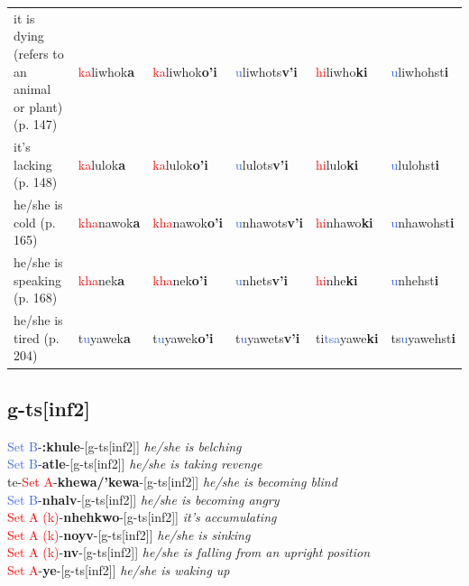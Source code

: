 \documentclass[oneside,openany]{book}%
\begin{document}
\begin{tabularx}{\textwidth}{>{\hsize=1.5\hsize\RaggedRight}X >{\hsize=0.9\hsize}X >{\hsize=0.9\hsize}X >{\hsize=0.9\hsize}X >{\hsize=0.9\hsize}X >{\hsize=0.9\hsize}X}
it is dying (refers to an animal or plant) (p. 147)&\textcolor{Red}{ka}liwhok\textbf{a}&\textcolor{Red}{ka}liwhok\textbf{o'i}&\textcolor{RoyalBlue}{u}liwhots\textbf{v'i}&\textcolor{Red}{hi}liwho\textbf{ki}&\textcolor{RoyalBlue}{u}liwhohst\textbf{i}\\%
it's lacking (p. 148)&\textcolor{Red}{ka}lulok\textbf{a}&\textcolor{Red}{ka}lulok\textbf{o'i}&\textcolor{RoyalBlue}{u}lulots\textbf{v'i}&\textcolor{Red}{hi}lulo\textbf{ki}&\textcolor{RoyalBlue}{u}lulohst\textbf{i}\\%
he/she is cold (p. 165)&\textcolor{Red}{kha}nawok\textbf{a}&\textcolor{Red}{kha}nawok\textbf{o'i}&\textcolor{RoyalBlue}{u}nhawots\textbf{v'i}&\textcolor{Red}{hi}nhawo\textbf{ki}&\textcolor{RoyalBlue}{u}nhawohst\textbf{i}\\%
he/she is speaking (p. 168)&\textcolor{Red}{kha}nek\textbf{a}&\textcolor{Red}{kha}nek\textbf{o'i}&\textcolor{RoyalBlue}{u}nhets\textbf{v'i}&\textcolor{Red}{hi}nhe\textbf{ki}&\textcolor{RoyalBlue}{u}nhehst\textbf{i}\\%
he/she is tired (p. 204)&t\textcolor{RoyalBlue}{u}yawek\textbf{a}&t\textcolor{RoyalBlue}{u}yawek\textbf{o'i}&t\textcolor{RoyalBlue}{u}yawets\textbf{v'i}&ti\textcolor{RoyalBlue}{tsa}yawe\textbf{ki}&ts\textcolor{RoyalBlue}{u}yawehst\textbf{i}\\%
\bottomrule%
\end{tabularx}%
\vspace{1em}%
\needspace{1in}%
\subsection*{g-ts[inf2]}%
\textcolor{RoyalBlue}{Set B}{-}\textbf{:khule}{-}[g-ts[inf2]] \textit{ he/she is belching} \\%
\textcolor{RoyalBlue}{Set B}{-}\textbf{atle}{-}[g-ts[inf2]] \textit{ he/she is taking revenge} \\%
te{-}\textcolor{Red}{Set A}{-}\textbf{khewa/'kewa}{-}[g-ts[inf2]] \textit{ he/she is becoming blind} \\%
\textcolor{RoyalBlue}{Set B}{-}\textbf{nhalv}{-}[g-ts[inf2]] \textit{ he/she is becoming angry} \\%
\textcolor{Red}{Set A (k)}{-}\textbf{nhehkwo}{-}[g-ts[inf2]] \textit{ it's accumulating} \\%
\textcolor{Red}{Set A (k)}{-}\textbf{noyv}{-}[g-ts[inf2]] \textit{ he/she is sinking} \\%
\textcolor{Red}{Set A (k)}{-}\textbf{nv}{-}[g-ts[inf2]] \textit{ he/she is falling from an upright position} \\%
\textcolor{Red}{Set A}{-}\textbf{ye}{-}[g-ts[inf2]] \textit{ he/she is waking up} \\%
\vspace{1em}%
\needspace{1in}%
\end{document}

